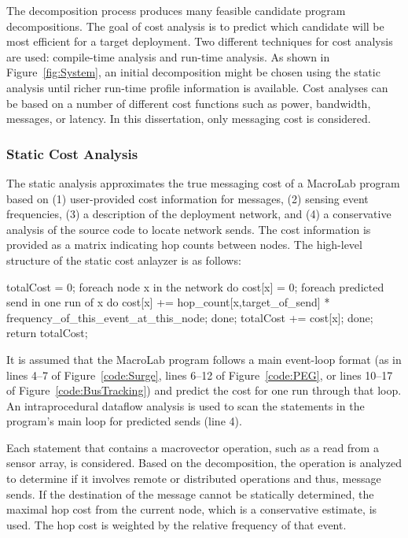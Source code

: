 The decomposition process produces many feasible candidate program
decompositions. The goal of cost analysis is to predict which
candidate will be most efficient for a target deployment.  Two
different techniques for cost analysis are used: compile-time analysis and
run-time analysis.  As shown in Figure~\ref{fig:System}, an initial
decomposition might be chosen using the static analysis until richer
run-time profile information is available. Cost analyses can be based
on a number of different cost functions such as power, bandwidth,
messages, or latency.  In this dissertation, only messaging cost is considered.

\subsubsection{Static Cost Analysis}\label{sect:staticCost}

The static analysis approximates the true messaging cost of a MacroLab
program based on (1) user-provided cost information for messages, (2) sensing event
frequencies, (3) a description of the deployment network, and (4) a conservative
analysis of the source code to locate network sends. The cost information
is provided as a matrix indicating hop counts between nodes. The high-level
structure of the static cost anlayzer is as follows: 

\begin{macrolab} 
totalCost = 0; 
foreach node x in the network do 
  cost[x] = 0;
  foreach predicted send in one run of x do
    cost[x] += hop_count[x,target_of_send] * frequency_of_this_event_at_this_node;
  done;
  totalCost += cost[x];
done;
return totalCost;
\end{macrolab} 

It is assumed that the MacroLab program follows a main event-loop format (as in
lines 4--7 of Figure~\ref{code:Surge}, lines 6--12 of Figure~\ref{code:PEG}, or
lines 10--17 of Figure~\ref{code:BusTracking}) and predict the cost for one run
through that loop. An intraprocedural dataflow analysis is used to scan the
statements in the program's main loop for predicted sends (line 4).

Each statement that contains a macrovector operation, such as a read from a
sensor array, is considered. Based on the decomposition, the operation is
analyzed to determine if it involves remote or distributed operations and thus,
message sends. If the destination of the message cannot be statically
determined, the maximal hop cost from the current node, which is a conservative
estimate, is used. The hop cost is weighted by the relative frequency of that
event.

